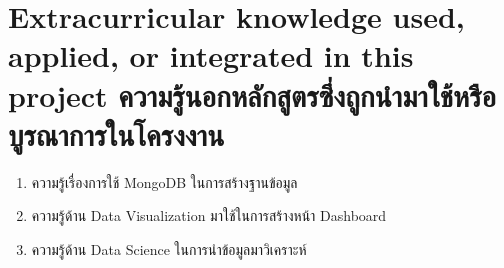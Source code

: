 \section{\ifenglish%
Extracurricular knowledge used, applied, or integrated in this project
\else%
ความรู้นอกหลักสูตรซึ่งถูกนำมาใช้หรือบูรณาการในโครงงาน
\fi
}
\begin{enumerate}
    \item ความรู้เรื่องการใช้ MongoDB ในการสร้างฐานข้อมูล
    \item ความรู้ด้าน Data Visualization มาใช้ในการสร้างหน้า Dashboard
    \item ความรู้ด้าน Data Science ในการนำข้อมูลมาวิเคราะห์
\end{enumerate}

